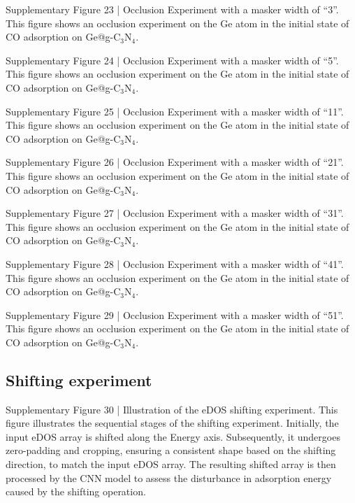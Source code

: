 Supplementary Figure 23 | Occlusion Experiment with a masker width of “3”. This figure shows an occlusion experiment on the Ge atom in the initial state of CO adsorption on Ge@g-C$_3$N$_4$.


Supplementary Figure 24 | Occlusion Experiment with a masker width of “5”. This figure shows an occlusion experiment on the Ge atom in the initial state of CO adsorption on Ge@g-C$_3$N$_4$.


Supplementary Figure 25 | Occlusion Experiment with a masker width of “11”. This figure shows an occlusion experiment on the Ge atom in the initial state of CO adsorption on Ge@g-C$_3$N$_4$.


Supplementary Figure 26 | Occlusion Experiment with a masker width of “21”. This figure shows an occlusion experiment on the Ge atom in the initial state of CO adsorption on Ge@g-C$_3$N$_4$.


Supplementary Figure 27 | Occlusion Experiment with a masker width of “31”. This figure shows an occlusion experiment on the Ge atom in the initial state of CO adsorption on Ge@g-C$_3$N$_4$.


Supplementary Figure 28 | Occlusion Experiment with a masker width of “41”. This figure shows an occlusion experiment on the Ge atom in the initial state of CO adsorption on Ge@g-C$_3$N$_4$.


Supplementary Figure 29 | Occlusion Experiment with a masker width of “51”. This figure shows an occlusion experiment on the Ge atom in the initial state of CO adsorption on Ge@g-C$_3$N$_4$.


\subsection{Shifting experiment}


Supplementary Figure 30 | Illustration of the eDOS shifting experiment. This figure illustrates the sequential stages of the shifting experiment. Initially, the input eDOS array is shifted along the Energy axis. Subsequently, it undergoes zero-padding and cropping, ensuring a consistent shape based on the shifting direction, to match the input eDOS array. The resulting shifted array is then processed by the CNN model to assess the disturbance in adsorption energy caused by the shifting operation.


